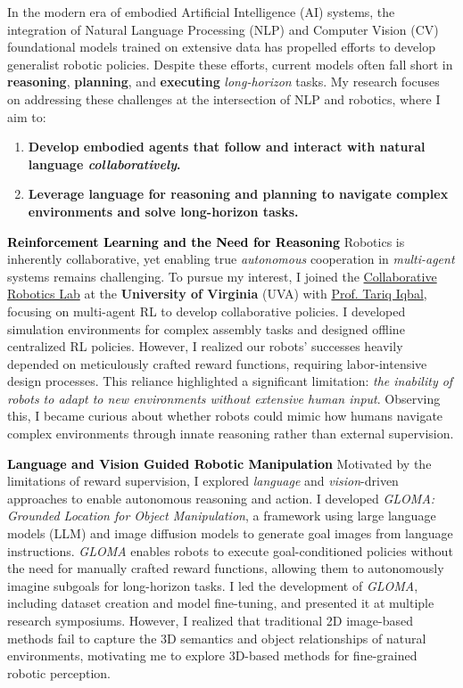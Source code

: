 \documentclass[12pt]{article}
\newcommand{\statement}[1]{\medskip\noindent
  \textcolor{black}{\textbf{#1}}\space
}
\begin{document}
\noindent In the modern era of embodied Artificial Intelligence (AI) systems, the integration of Natural Language Processing (NLP) and Computer Vision (CV) foundational models trained on extensive data has propelled efforts to develop generalist robotic policies. Despite these efforts, current models often fall short in \textbf{reasoning}, \textbf{planning}, and \textbf{executing} \textit{long-horizon} tasks. My research focuses on addressing these challenges at the intersection of NLP and robotics, where I aim to:
\begin{enumerate}[label=(\arabic*), itemindent=0pt, itemsep=0pt, parsep=0pt, nosep]
  \item \textbf{Develop embodied agents that follow and interact with natural language \textit{collaboratively}.}
  \item \textbf{Leverage language for reasoning and planning to navigate complex environments and solve long-horizon tasks.}
\end{enumerate}

\statement{Reinforcement Learning and the Need for Reasoning} Robotics is inherently collaborative, yet enabling true \textit{autonomous} cooperation in \textit{multi-agent} systems remains challenging. To pursue my interest, I joined the \href{https://www.collabrobotics.com/}{Collaborative Robotics Lab} at the \textbf{University of Virginia} (UVA) with \href{https://www.tiqbal.com/}{Prof. Tariq Iqbal}, focusing on multi-agent RL to develop collaborative policies. I developed simulation environments for complex assembly tasks and designed offline centralized RL policies. However, I realized our robots' successes heavily depended on meticulously crafted reward functions, requiring labor-intensive design processes. This reliance highlighted a significant limitation: \textit{the inability of robots to adapt to new environments without extensive human input}. Observing this, I became curious about whether robots could mimic how humans navigate complex environments through innate reasoning rather than external supervision.

\statement{Language and Vision Guided Robotic Manipulation} Motivated by the limitations of reward supervision, I explored \textit{language} and \textit{vision}-driven approaches to enable autonomous reasoning and action. I developed \textit{GLOMA: Grounded Location for Object Manipulation}, a framework using large language models (LLM) and image diffusion models to generate goal images from language instructions. \textit{GLOMA} enables robots to execute goal-conditioned policies without the need for manually crafted reward functions, allowing them to autonomously imagine subgoals for long-horizon tasks. I led the development of \textit{GLOMA}, including dataset creation and model fine-tuning, and presented it at multiple research symposiums. However, I realized that traditional 2D image-based methods fail to capture the 3D semantics and object relationships of natural environments, motivating me to explore 3D-based methods for fine-grained robotic perception.
\end{document}
